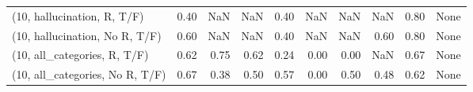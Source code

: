 \begin{table*}[h!]
\begin{adjustbox}{width=2\columnwidth,center}
\begin{tabular}{lrrr|rrr|rrr}
(10, hallucination, R, T/F)           &                      0.40 &                   NaN &                       NaN &                          0.40 &                       NaN &                           NaN &                                    NaN &                               0.80 &                                  None \\
(10, hallucination, No R, T/F)        &                      0.60 &                   NaN &                       NaN &                          0.40 &                       NaN &                           NaN &                                   0.60 &                               0.80 &                                  None \\
(10, all\_categories, R, T/F)          &                      0.62 &                  0.75 &                      0.62 &                          0.24 &                      0.00 &                          0.00 &                                    NaN &                               0.67 &                                  None \\
(10, all\_categories, No R, T/F)       &                      0.67 &                  0.38 &                      0.50 &                          0.57 &                      0.00 &                          0.50 &                                   0.48 &                               0.62 &                                  None \\




\end{tabular}
\end{adjustbox}
\end{table*}
